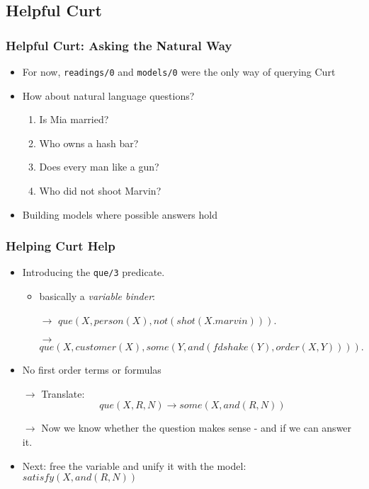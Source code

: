 \documentclass{beamer}
\begin{document}
\subsection{Helpful Curt}
\begin{frame}
\frametitle{Helpful Curt: Asking the Natural Way}
  \begin{itemize}
    \item For now, \texttt{readings/0} and \texttt{models/0} were the only way of
    querying Curt
    \item How about natural language questions?
    \begin{enumerate}
      \item Is Mia married?
      \item Who owns a hash bar?
      \item Does every man like a gun?
      \item Who did not shoot Marvin?
    \end{enumerate}
    \item Building models where possible answers hold
  \end{itemize}
\end{frame}

\begin{frame}
\frametitle{Helping Curt Help}
  \begin{itemize}
    \item Introducing the \texttt{que/3} predicate.
    \begin{itemize}
      \item basically a \emph{variable binder}:
      \item[$\to$] $que(X, person(X), not(shot(X. marvin))).$
      \item[$\to$] $que(X, customer(X), some(Y, and(fdshake(Y), order(X,Y)))).$
    \end{itemize}
    \item No first order terms or formulas
    \item[$\to$] Translate:
    \begin{equation}
      que(X,R,N) \to some(X, and (R,N))
    \end{equation}
    \item[$\to$] Now we know whether the question makes sense - and if we can
    answer it.
    \item Next: free the variable and unify it with the model: $satisfy(X, and(R,N))$
  \end{itemize}
\end{frame}
\end{document}
